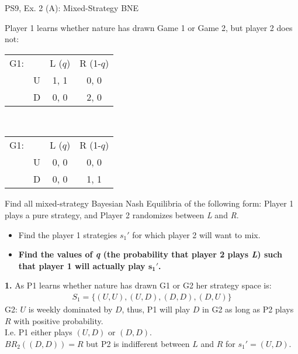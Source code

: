 \begin{frame}{PS9, Ex. 2 (A): Mixed-Strategy BNE}
    \begin{multicols}{2}
      Player 1 learns whether nature has drawn Game 1 or Game 2, but player 2 does not:
      \begin{table}
        \begin{tabular}{ll|c|c|}
          \multicolumn{1}{c}{G1:} & \multicolumn{1}{c}{} & \multicolumn{1}{c}{L ($q$)} & \multicolumn{1}{c}{R (1-$q$)} \\\cline{3-4}
          & U & 1, 1 & 0, 0 \\\cline{3-4}
          & D & 0, 0 & 2, 0 \\\cline{3-4}
        \end{tabular}\\\bigskip
        \begin{tabular}{ll|c|c|}
          \multicolumn{1}{c}{G1:} & \multicolumn{1}{c}{} & \multicolumn{1}{c}{L ($q$)} & \multicolumn{1}{c}{R (1-$q$)} \\\cline{3-4}
          & U & 0, 0 & 0, 0 \\\cline{3-4}
          & D & 0, 0 & 1, 1 \\\cline{3-4}
        \end{tabular}
      \end{table}
      Find all mixed-strategy Bayesian Nash Equilibria of the following form: Player 1 plays a pure strategy, and Player 2 randomizes between \textit{L} and \textit{R}.
      \begin{itemize}
        \item[Step 1:] Find the player 1 strategies $s_1'$ for which player 2 will want to mix.
        \item[Step 2:] \textbf{Find the values of \textit{q} (the probability that player 2 plays \textit{L}) such that player 1 will actually play $\bm{s_1'}$.}
      \end{itemize}
      \vfill\null\columnbreak
      \textbf{1.} As P1 learns whether nature has drawn G1 or G2 her strategy space is:
      \begin{align*}
        S_1=\{(U,U),(U,D),(D,D),(D,U)\}
      \end{align*}
      G2: $U$ is weekly dominated by $D$, thus, P1 will play $D$ in G2 as long as P2 plays $R$ with positive probability.\\\medskip I.e. P1 either plays $(U,D)$ or $(D,D)$.\\\medskip
      $BR_2((D,D))=R$ but P2 is indifferent between $L$ and $R$ for $s_1'=(U,D)$.
      \vfill\null
    \end{multicols}
\end{frame}
